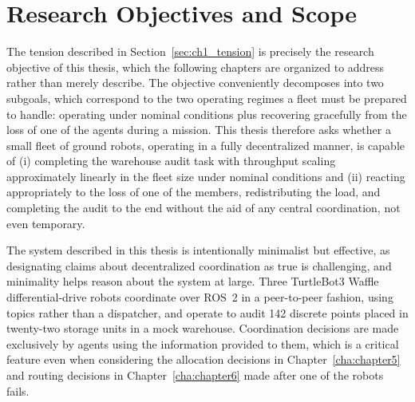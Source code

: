 \section{Research Objectives and Scope\label{sec:ch1_scope}}

The tension described in Section~\ref{sec:ch1_tension} is precisely the research objective of this thesis, which the following chapters are organized to address rather than merely describe. The objective conveniently decomposes into two subgoals, which correspond to the two operating regimes a fleet must be prepared to handle: operating under nominal conditions plus recovering gracefully from the loss of one of the agents during a mission. This thesis therefore asks whether a small fleet of ground robots, operating in a fully decentralized manner, is capable of (i) completing the warehouse audit task with throughput scaling approximately linearly in the fleet size under nominal conditions and (ii) reacting appropriately to the loss of one of the members, redistributing the load, and completing the audit to the end without the aid of any central coordination, not even temporary.

The system described in this thesis is intentionally minimalist but effective, as designating claims about decentralized coordination as true is challenging, and minimality helps reason about the system at large. Three TurtleBot3 Waffle differential-drive robots coordinate over ROS~2 in a peer-to-peer fashion, using topics rather than a dispatcher, and operate to audit 142 discrete points placed in twenty-two storage units in a mock warehouse. Coordination decisions are made exclusively by agents using the information provided to them, which is a critical feature even when considering the allocation decisions in Chapter~\ref{cha:chapter5} and routing decisions in Chapter~\ref{cha:chapter6} made after one of the robots fails.

